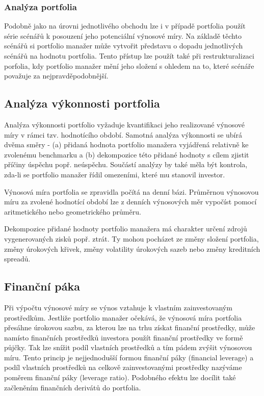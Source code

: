 \documentclass[a4paper]{book}
\begin{document}
\subsubsection{Analýza portfolia}

Podobně jako na úrovni jednotlivého obchodu lze i v případě portfolia použít série scénářů k posouzení jeho potenciální výnosové míry. Na základě těchto scénářů si portfolio manažer může vytvořit představu o dopadu jednotlivých scénářů na hodnotu portfolia. Tento přístup lze použít také při restrukturalizaci porfolia, kdy portfolio manažer mění jeho složení s ohledem na to, které scénáře považuje za nejpravděpodobnější.

\subsection{Analýza výkonnosti portfolia}

Analýza výkonnosti portfolio vyžaduje kvantifikaci jeho realizované výnosové míry v rámci tzv. hodnotícího období. Samotná analýza výkonnosti se ubírá dvěma směry - (a) přidaná hodnota portfolio manažera vyjádřená relativně ke zvolenému benchmarku a (b) dekompozice této přidané hodnoty s cílem zjistit příčiny úspěchu popř. neúspěchu. Součástí analýzy by také měla být kontrola, zda-li se portfolio manažer řídil omezeními, které mu stanovil investor.  

Výnosová míra portfolia se zpravidla počítá na denní bázi. Průměrnou výnosovou míru za zvolené hodnotící období lze z denních výnosových měr vypočíst pomocí aritmetického nebo geometrického průměru.

Dekompozice přidané hodnoty portfolio manažera má charakter určení zdrojů vygenerovaných zisků popř. ztrát. Ty mohou pocházet ze změny složení portfolia, změny úrokových křivek, změny volatility úrokových sazeb nebo změny kreditních spreadů.

\subsection{Finanční páka}

Při výpočtu výnosové míry se výnos vztahuje k vlastním zainvestovaným prostředkům. Jestliže portfolio manažer očekává, že výnosová míra portfolia přesáhne úrokovou sazbu, za kterou lze na trhu získat finanční prostředky, může namísto finančních prostředků investora použít finanční prostředky ve formě půjčky. Tak lze snížit podíl vlastních prostředků a tím pádem zvýšit výnosovou míru. Tento princip je nejjednodušší formou finanční páky (financial leverage) a podíl vlastních prostředků na celkově zainvestovanými prostředky nazýváme poměrem finanční páky (leverage ratio). Podobného efektu lze docílit také začleněním finančních derivátů do portfolia.
\end{document}
